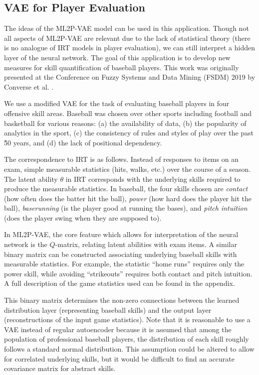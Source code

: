 \subsection{VAE for Player Evaluation}
The ideas of the ML2P-VAE model can be used in this application. Though not all aspects of ML2P-VAE are relevant due to the lack of statistical theory (there is no analogue of IRT models in player evaluation), we can still interpret a hidden layer of the neural network. The goal of this application is to develop new measures for skill quantification of baseball players. This work was originally presented at the Conference on Fuzzy Systems and Data Mining (FSDM) 2019 by Converse et al. \cite{fsdm_paper}.

We use a modified VAE for the task of evaluating baseball players in four offensive skill areas. Baseball was chosen over other sports including football and basketball for various reasons: (a) the availability of data, (b) the popularity of analytics in the sport, (c) the consistency of rules and styles of play over the past \~50 years, and (d) the lack of positional dependency.

The correspondence to IRT is as follows. Instead of responses to items on an exam, simple measurable statistics (hits, walks, etc.) over the course of a season. The latent ability $\theta$ in IRT corresponds with the underlying skills required to produce the measurable statistics. In baseball, the four skills chosen are \textit{contact} (how often does the batter hit the ball), \textit{power} (how hard does the player hit the ball), \textit{baserunning} (is the player good at running the bases), and \textit{pitch intuition} (does the player swing when they are supposed to).

In ML2P-VAE, the core feature which allows for interpretation of the neural network is the $Q$-matrix, relating latent abilities with exam items. A similar binary matrix can be constructed associating underlying baseball skills with measurable statistics. For example, the statistic ``home runs'' requires only the power skill, while avoiding ``strikeouts'' requires both contact and pitch intuition. A full description of the game statistics used can be found in the appendix. 

This binary matrix determines the non-zero connections between the learned distribution layer (representing baseball skills) and the output layer (reconstructions of the input game statistics). Note that it is reasonable to use a VAE instead of regular autoencoder because it is assumed that among the population of professional baseball players, the distribution of each skill roughly follows a standard normal distribution. This assumption could be altered to allow for correlated underlying skills, but it would be difficult to find an accurate covariance matrix for abstract skills.

